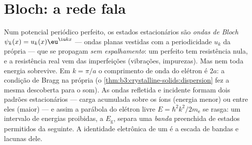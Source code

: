 \section{Bloch: a rede fala}

\begin{theorem}\label{thm:b3:electrons-in-solids:bloch}
Num potencial periódico perfeito, os estados estacionários são
\emph{ondas de Bloch} $\psi_k(x) = u_k(x)\eu^{\iu kx}$ ---
ondas planas vestidas com a periodicidade $u_k$ da própria  ---
que se propagam \emph{sem espalhamento}: um  perfeito tem
resistência nula, e a resistência real vem das imperfeições
(vibrações, impurezas). Mas nem toda energia sobrevive. Em
$k = \pi/a$ o comprimento de onda do elétron é $2a$: a condição de Bragg
na própria  (o \cref{thm:b3:crystalline-solids:dispersion}
fez a mesma descoberta para o som). As ondas refletida e incidente
formam dois padrões estacionários --- carga acumulada sobre os íons
(energia menor) ou entre eles (maior) --- e assim a parábola do elétron
livre $E = \hbar^2k^2/2m_{\text{e}}$ se rasga: um intervalo de
energias proibidas, a \emph{} $E_{\text{g}}$, separa
uma \emph{banda} preenchida de estados permitidos da seguinte. A
identidade eletrônica de um  é a escada de bandas e lacunas dele.
\end{theorem}
\admitted

